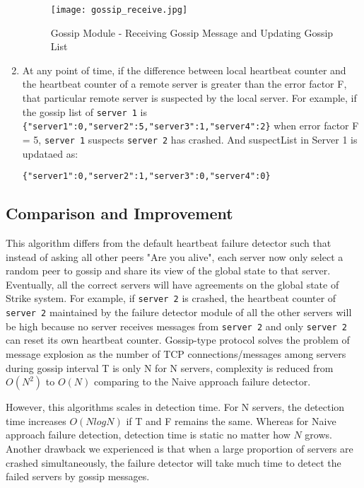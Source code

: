 \documentclass[dareport.tex]{subfiles}
\begin{document}
\begin{enumerate}[leftmargin=*]
\begin{figure}[h]
\label{fig:Gossip Module - Receiving Gossip Message and Updating Gossip List}
\texttt{[image: gossip\_receive.jpg]}
\caption{Gossip Module - Receiving Gossip Message and Updating Gossip List}
\centering
\end{figure}


\item At any point of time, if the difference between local heartbeat counter and the heartbeat counter of a remote server is greater than the error factor F, that particular remote server is suspected by the local server. For example, if the gossip list of \verb|server 1| is \verb|{"server1":0,"server2":5,"server3":1,"server4":2}| when error factor F = 5, \verb|server 1| suspects \verb|server 2| has crashed. And suspectList in Server 1 is updataed as:

\verb|{"server1":0,"server2":1,"server3":0,"server4":0}|

\end{enumerate}

\subsection{Comparison and Improvement}

This algorithm differs from the default heartbeat failure detector such that instead of asking all other peers "Are you alive", each server now only select a random peer to gossip and share its view of the global state to that server. Eventually, all the correct servers will have agreements on the global state of Strike system. For example, if \verb|server 2| is crashed, the heartbeat counter of \verb|server 2| maintained by the failure detector module of all the other servers will be high because no server receives messages from \verb|server 2| and only \verb|server 2| can reset its own heartbeat counter. Gossip-type protocol solves the problem of message explosion as the number of TCP connections/messages among servers during gossip interval T is only N for N servers, complexity is reduced from $O({N^2})$ to $O(N)$ comparing to the Naive approach failure detector.

However, this algorithms scales in detection time. For N servers, the detection time increases $O(NlogN)$\cite{gossip} if T and F remains the same. Whereas for Naive approach failure detection, detection time is static no matter how $N$ grows. Another drawback we experienced is that when a large proportion of servers are crashed simultaneously, the failure detector will take much time to detect the failed servers by gossip messages.
\end{document}
